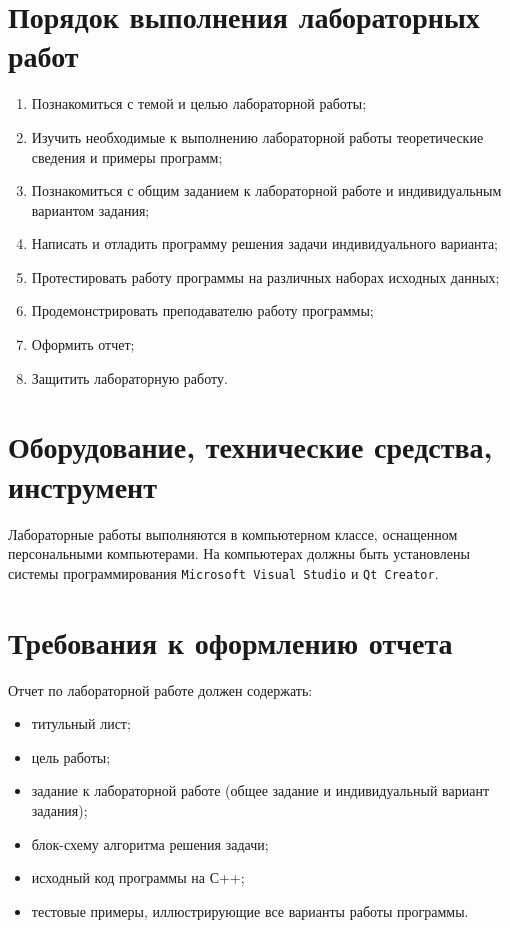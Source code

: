 \documentclass[main.tex]{subfiles}
\begin{document}
\newpage


\section*{Порядок выполнения лабораторных работ}

\begin{enumerate}
    \item Познакомиться с темой и целью лабораторной работы;
    \item Изучить необходимые к выполнению лабораторной работы теоретические сведения и примеры программ;
    \item Познакомиться с общим заданием к лабораторной работе и индивидуальным вариантом задания;
    \item Написать и отладить программу решения задачи индивидуального варианта;
    \item Протестировать работу программы на различных наборах исходных данных;
    \item Продемонстрировать преподавателю работу программы;
    \item Оформить отчет;
    \item Защитить лабораторную работу.
\end{enumerate}

\section*{Оборудование, технические средства, инструмент}

Лабораторные работы выполняются в компьютерном классе, оснащенном персональными компьютерами.
На компьютерах должны быть установлены системы программирования \texttt{Microsoft Visual Studio} и \texttt{Qt Creator}.

\section*{Требования к оформлению отчета}

Отчет по лабораторной работе должен содержать:

\begin{itemize}
    \item титульный лист;
    \item цель работы;
    \item задание к лабораторной работе (общее задание и индивидуальный вариант задания);
    \item блок-схему алгоритма решения задачи;
    \item исходный код программы на С++;
    \item тестовые примеры, иллюстрирующие все варианты работы программы.
\end{itemize}
\end{document}
